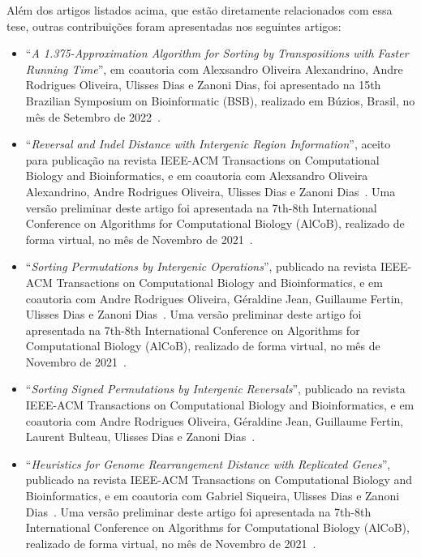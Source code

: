 Além dos artigos listados acima, que estão diretamente relacionados com essa tese, outras contribuições foram apresentadas nos seguintes artigos:

\begin{itemize}
  \item ``\textit{A 1.375-Approximation Algorithm for Sorting by Transpositions with Faster Running Time}'', em coautoria com Alexsandro Oliveira Alexandrino, Andre Rodrigues Oliveira, Ulisses Dias e Zanoni Dias, foi apresentado na 15th Brazilian Symposium on Bioinformatic (BSB), realizado em Búzios, Brasil, no mês de Setembro de 2022~\cite{2022bsb-alexandrino-etal}.

  \item ``\textit{Reversal and Indel Distance with Intergenic Region Information}'', aceito para publicação na revista IEEE-ACM Transactions on Computational Biology and Bioinformatics, e em coautoria com Alexsandro Oliveira Alexandrino, Andre Rodrigues Oliveira, Ulisses Dias e Zanoni Dias~\cite{2022b-alexandrino-etal}. Uma versão preliminar deste artigo foi apresentada na 7th-8th International Conference on Algorithms for Computational Biology (AlCoB), realizado de forma virtual, no mês de Novembro de 2021~\cite{2021b-alexandrino-etal}.

  \item ``\textit{Sorting Permutations by Intergenic Operations}'', publicado na revista IEEE-ACM Transactions on Computational Biology and Bioinformatics, e em coautoria com Andre Rodrigues Oliveira, Géraldine Jean, Guillaume Fertin, Ulisses Dias e Zanoni Dias~\cite{2021a-oliveira-etal}. Uma versão preliminar deste artigo foi apresentada na 7th-8th International Conference on Algorithms for Computational Biology (AlCoB), realizado de forma virtual, no mês de Novembro de 2021~\cite{2020-oliveira-etal}.

  \item ``\textit{Sorting Signed Permutations by Intergenic Reversals}'', publicado na revista IEEE-ACM Transactions on Computational Biology and Bioinformatics, e em coautoria com Andre Rodrigues Oliveira, Géraldine Jean, Guillaume Fertin, Laurent Bulteau, Ulisses Dias e Zanoni Dias~\cite{2021b-oliveira-etal}.

  \item ``\textit{Heuristics for Genome Rearrangement Distance with Replicated Genes}'', publicado na revista IEEE-ACM Transactions on Computational Biology and Bioinformatics, e em coautoria com Gabriel Siqueira, Ulisses Dias e Zanoni Dias~\cite{2021a-siqueira-etal}. Uma versão preliminar deste artigo foi apresentada na 7th-8th International Conference on Algorithms for Computational Biology (AlCoB), realizado de forma virtual, no mês de Novembro de 2021~\cite{2020-siqueira-etal}.


\end{itemize}
